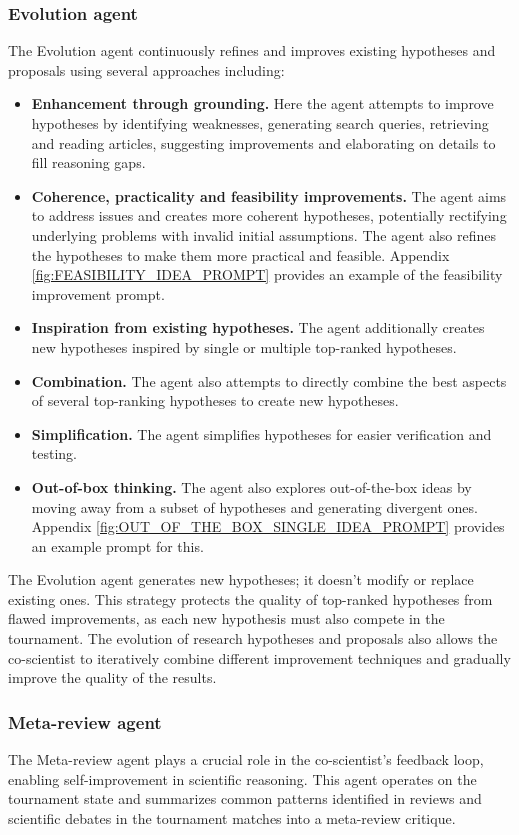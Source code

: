 \subsubsection{Evolution agent}
The Evolution agent continuously refines and improves existing hypotheses and proposals using several approaches including:
\begin{itemize}
    \item \textbf{Enhancement through grounding.} Here the agent attempts to improve hypotheses by identifying weaknesses, generating search queries, retrieving and reading articles, suggesting improvements and elaborating on details to fill reasoning gaps.
    \item \textbf{Coherence, practicality and feasibility improvements.} The agent aims to address issues and creates more coherent hypotheses, potentially rectifying underlying problems with invalid initial assumptions. The agent also refines the hypotheses to make them more practical and feasible. Appendix \cref{fig:FEASIBILITY_IDEA_PROMPT} provides an example of the feasibility improvement prompt.
    \item \textbf{Inspiration from existing hypotheses.} The agent additionally creates new hypotheses inspired by single or multiple top-ranked hypotheses.
    \item \textbf{Combination.} The agent also attempts to directly combine the best aspects of several top-ranking hypotheses to create new hypotheses.
    \item \textbf{Simplification.} The agent simplifies hypotheses for easier verification and testing.
    \item \textbf{Out-of-box thinking.} The agent also explores out-of-the-box ideas by moving away from a subset of hypotheses and generating divergent ones. Appendix \cref{fig:OUT_OF_THE_BOX_SINGLE_IDEA_PROMPT} provides an example prompt for this.
\end{itemize}

The Evolution agent generates new hypotheses; it doesn't modify or replace existing ones. This strategy protects the quality of top-ranked hypotheses from flawed improvements, as each new hypothesis must also compete in the tournament. The evolution of research hypotheses and proposals also allows the co-scientist to iteratively combine different improvement techniques and gradually improve the quality of the results.


\subsubsection{Meta-review agent}
The Meta-review agent plays a crucial role in the co-scientist's feedback loop, enabling self-improvement in scientific reasoning. This agent operates on the tournament state and summarizes common patterns identified in reviews and scientific debates in the tournament matches into a meta-review critique.


